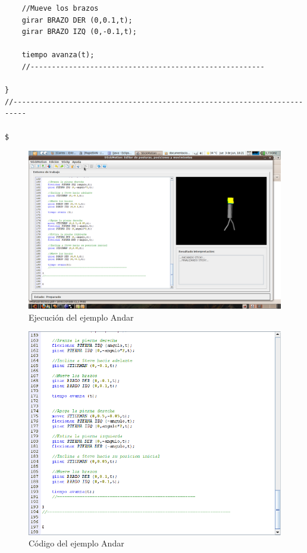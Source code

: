 \documentclass[a4paper, 12pt]{book}
\begin{document}
\begin{itemize}
\begin{verbatim}
    //Mueve los brazos
    girar BRAZO DER (0,0.1,t);
    girar BRAZO IZQ (0,-0.1,t);

    tiempo avanza(t);
    //-------------------------------------------------------

}
//-------------------------------------------------------------------------

$
\end{verbatim}
  
  
  
  
\begin{figure}[htb]
  \centerline{\includegraphics[width=\textwidth]{./imagenes/andar.png}}
  \caption{Ejecución del ejemplo Andar}
\end{figure}


\begin{figure}[htb]
  \centerline{\includegraphics[width=\textwidth]{./imagenes/andar-codigo.png}}
\caption{Código del ejemplo Andar}
\end{figure}



\end{itemize}
\end{document}
